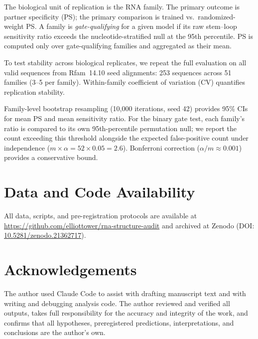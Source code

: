 \documentclass[11pt]{article}
\begin{document}
The biological unit of replication is the RNA family. The primary outcome is
partner specificity (PS); the primary comparison is trained vs.\
randomized-weight PS. A family is \emph{gate-qualifying} for a given model
if its raw stem--loop sensitivity ratio exceeds the nucleotide-stratified
null at the 95th percentile. PS is computed only over gate-qualifying
families and aggregated as their mean.

To test stability across biological replicates, we repeat the full
evaluation on all valid sequences from Rfam~14.10 seed alignments: 253
sequences across 51 families (3--5 per family). Within-family coefficient
of variation (CV) quantifies replication stability.

Family-level bootstrap resampling (10{,}000 iterations, seed 42)
provides 95\% CIs for mean PS and mean sensitivity ratio. For the binary
gate test, each family's ratio is compared to its own 95th-percentile
permutation null; we report the count exceeding this threshold alongside
the expected false-positive count under independence
($m \times \alpha = 52 \times 0.05 = 2.6$). Bonferroni correction
($\alpha / m \approx 0.001$) provides a conservative bound.


\section*{Data and Code Availability}

All data, scripts, and pre-registration protocols are available at
\url{https://github.com/elliottower/rna-structure-audit} and archived at
Zenodo (DOI: \href{https://doi.org/10.5281/zenodo.21362717}{10.5281/zenodo.21362717}).


\section*{Acknowledgements}

The author used Claude Code \citep{anthropic2025claude} to assist with
drafting manuscript text and with writing and debugging analysis code.
The author reviewed and verified all outputs, takes full responsibility
for the accuracy and integrity of the work, and confirms that all
hypotheses, preregistered predictions, interpretations, and conclusions
are the author's own.
\end{document}
